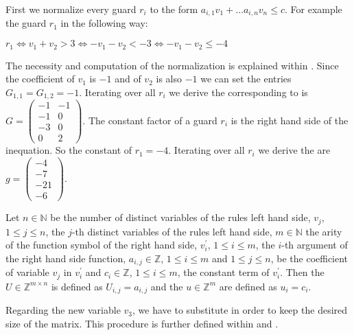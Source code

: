 \begin{example}
	\label{ex:guardmatrix-and-constants}
	First we normalize every guard $r_i$ to the form $a_{i,1}v_1+\dots a_{i,n}v_n \le c$. For example the guard $r_1$ in the following way:
	\begin{center}
		$r_1 \Leftrightarrow v_1+v_2 > 3  \Leftrightarrow -v_1-v_2 < -3 \Leftrightarrow -v_1-v_2 \le -4$
	\end{center}
	The necessity and computation of the normalization is explained within .\newline
	Since the coefficient of $v_1$ is $-1$ and of $v_2$ is also $-1$ we can set the entries $G_{1,1} = G_{1,2}=-1$.
	Iterating over all $r_i$ we derive the corresponding \guardmatrix to  is $G = \begin{pmatrix} -1 & -1 \\ -1 & 0 \\ -3 & 0 \\ 0 & 2 \end{pmatrix}$.
	The constant factor of a guard $r_i$ is the right hand side of the inequation. So the constant of $r_1=-4$. Iterating over all $r_i$ we derive the \guardconstants are $g= \begin{pmatrix} -4 \\ -7 \\ -21 \\ -6 \end{pmatrix}$.	
\end{example}

\begin{definition}
	\label{def:update}
	Let $n \in \mathbb{N}$ be the number of distinct variables of the \loopt rules left hand side, $v_j$, $1 \le j \le n$, the $j$-th distinct	variables of the \loopt rules left hand side, $m \in \mathbb{N}$ the arity of the function symbol of the right hand side, $v^\prime_i$, $1 \le i \le m$, the $i$-th argument of the right hand side function, $a_{i,j} \in \mathbb{Z}$, $1 \le i \le m$ and $1 \le j \le n$, be the coefficient of variable $v_j$ in $v^\prime_i$ and $c_i \in \mathbb{Z}$, $1 \le i \le m$, the constant term of $v^\prime_i$. \newline
	Then the \updatematrix $U \in \mathbb{Z}^{m \times n}$ is defined as $U_{i,j}=a_{i,j}$ and the \updateconstants $u \in \mathbb{Z}^m$ are defined as $u_i = c_i$.
\end{definition}
Regarding the new variable $v_3$, we have to substitute in order to keep the desired size of the matrix. This procedure is further defined within  and .


